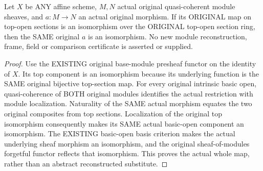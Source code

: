 \begin{proposition}
\label{scheme:existing-affine-qc-top-isomorphism}
\leanok
{}
Let $X$ be ANY affine scheme, $M,N$ actual original quasi-coherent module
sheaves, and $a:M\to N$ an actual original morphism. If its ORIGINAL
map on top-open sections is an isomorphism over the ORIGINAL top-open
section ring, then the SAME original $a$ is an isomorphism. No new
module reconstruction, frame, field or comparison certificate is
asserted or supplied.
\end{proposition}
\begin{proof}
Use the EXISTING original base-module presheaf functor on the identity
of $X$. Its top component is an isomorphism because its underlying
function is the SAME original bijective top-section map. For every
original intrinsic basic open, quasi-coherence of BOTH original modules
identifies the actual restriction with module localization. Naturality
of the SAME actual morphism equates the two original composites from
top sections. Localization of the original top isomorphism consequently
makes its SAME actual basic-open component an isomorphism. The EXISTING
basic-open basis criterion makes the actual underlying sheaf morphism
an isomorphism, and the original sheaf-of-modules forgetful functor
reflects that isomorphism. This proves the actual whole map, rather
than an abstract reconstructed substitute.
\end{proof}

